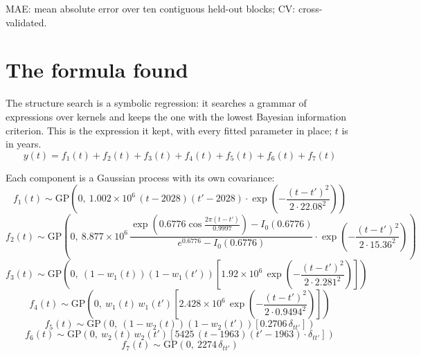 \documentclass[11pt,a4paper]{article}
\begin{document}
MAE: mean absolute error over ten contiguous held-out blocks; CV: cross-validated.

\section*{The formula found}

The structure search is a symbolic regression: it searches a grammar of expressions over kernels and keeps the one with the lowest Bayesian information criterion. This is the expression it kept, with every fitted parameter in place; $t$ is in years.
\begin{dmath*}
y(t) = f_{1}(t) + f_{2}(t) + f_{3}(t) + f_{4}(t) + f_{5}(t) + f_{6}(t) + f_{7}(t)
\end{dmath*}

Each component is a Gaussian process with its own covariance:
\begin{dmath*}
f_{1}(t) \sim \mathrm{GP}\!\left(0,\ 1.002 \times 10^{6}\,(t - 2028)(t' - 2028) \cdot \exp\!\left(-\frac{(t - t')^2}{2 \cdot 22.08^2}\right)\right)
\end{dmath*}
\begin{dmath*}
f_{2}(t) \sim \mathrm{GP}\!\left(0,\ 8.877 \times 10^{6}\,\frac{\exp\!\left(0.6776\cos\frac{2\pi (t - t')}{0.9997}\right) - I_0(0.6776)}{e^{0.6776} - I_0(0.6776)} \cdot \exp\!\left(-\frac{(t - t')^2}{2 \cdot 15.36^2}\right)\right)
\end{dmath*}
\begin{dmath*}
f_{3}(t) \sim \mathrm{GP}\!\left(0,\ (1 - w_{1}(t))(1 - w_{1}(t'))\left[1.92 \times 10^{6}\,\exp\!\left(-\frac{(t - t')^2}{2 \cdot 2.281^2}\right)\right]\right)
\end{dmath*}
\begin{dmath*}
f_{4}(t) \sim \mathrm{GP}\!\left(0,\ w_{1}(t)\,w_{1}(t')\left[2.428 \times 10^{6}\,\exp\!\left(-\frac{(t - t')^2}{2 \cdot 0.9494^2}\right)\right]\right)
\end{dmath*}
\begin{dmath*}
f_{5}(t) \sim \mathrm{GP}\!\left(0,\ (1 - w_{2}(t))(1 - w_{2}(t'))\left[0.2706\,\delta_{t t'}\right]\right)
\end{dmath*}
\begin{dmath*}
f_{6}(t) \sim \mathrm{GP}\!\left(0,\ w_{2}(t)\,w_{2}(t')\left[5425\,(t - 1963)(t' - 1963) \cdot \delta_{t t'}\right]\right)
\end{dmath*}
\begin{dmath*}
f_{7}(t) \sim \mathrm{GP}\!\left(0,\ 2274\,\delta_{t t'}\right)
\end{dmath*}
\end{document}
